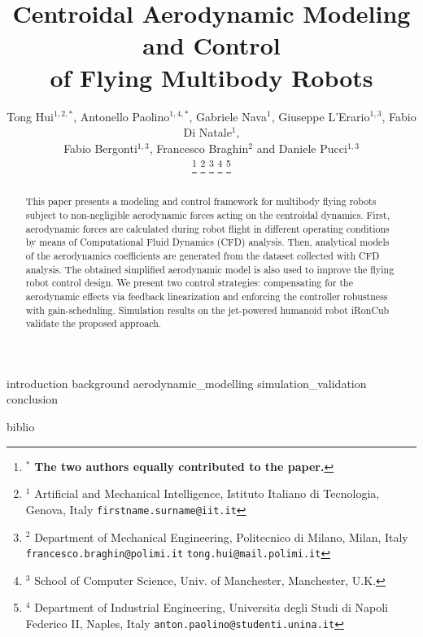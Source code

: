 \documentclass[letterpaper, 10 pt, conference]{ieeeconf}  %
\title{\LARGE \bf
Centroidal Aerodynamic Modeling and Control  \\ of Flying Multibody Robots 
}
\author{Tong Hui$^{1,2,\textbf{*}}$, Antonello Paolino$^{1,4,\textbf{*}}$, Gabriele Nava$^{1}$, Giuseppe L'Erario$^{1,3}$, Fabio Di Natale$^{1}$,\\ Fabio Bergonti$^{1,3}$, Francesco Braghin$^{2}$ and Daniele Pucci$^{1,3}$

\thanks{$^\textbf{*}$ \textbf{The two authors equally contributed to the paper.}}%
\thanks{$^{1}$ Artificial and Mechanical Intelligence, Istituto Italiano di Tecnologia, Genova, Italy {\tt\small firstname.surname@iit.it}}%
\thanks{$^{2}$ Department of Mechanical Engineering, Politecnico di Milano, Milan, Italy {\tt\small francesco.braghin@polimi.it} {\tt\small tong.hui@mail.polimi.it}}%
\thanks{$^{3}$ School of Computer Science, Univ. of Manchester, Manchester, U.K.}
\thanks{$^{4}$ Department of Industrial Engineering, Universit$\grave{a}$ degli Studi di Napoli Federico II, Naples, Italy {\tt\small anton.paolino@studenti.unina.it}} 
}
\begin{document}
\maketitle
\thispagestyle{empty}
\pagestyle{empty}

\begin{abstract}

This paper presents a modeling and control framework for multibody flying robots  subject to non-negligible aerodynamic forces acting on the centroidal dynamics.
First, aerodynamic forces are calculated during robot flight in different operating conditions by means of Computational Fluid Dynamics (CFD) analysis.
Then, analytical models of the aerodynamics coefficients are generated from the dataset collected with CFD analysis. The obtained simplified aerodynamic model is also used to improve the flying robot control design. We present two control strategies: compensating for the aerodynamic effects via feedback linearization and enforcing the controller robustness with gain-scheduling. Simulation results on the jet-powered humanoid robot iRonCub validate the proposed approach.

\end{abstract}


{introduction}
{background}
{aerodynamic_modelling}
{simulation_validation}
{conclusion}




{biblio}
\end{document}
